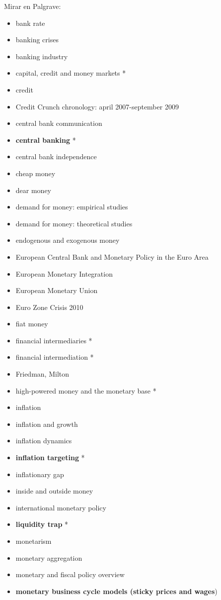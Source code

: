 \documentclass{nuevotema}
\begin{document}
Mirar en Palgrave:

\begin{itemize}
	\item bank rate
	\item banking crises
	\item banking industry
	\item capital, credit and money markets *
	\item credit
	\item Credit Crunch chronology: april 2007-september 2009
	\item central bank communication
	\item \textbf{central banking} *
	\item central bank independence
	\item cheap money
	\item dear money
	\item demand for money: empirical studies
	\item demand for money: theoretical studies
	\item endogenous and exogenous money
	\item European Central Bank and Monetary Policy in the Euro Area
	\item European Monetary Integration
	\item European Monetary Union
	\item Euro Zone Crisis 2010
	\item fiat money
	\item financial intermediaries *
	\item financial intermediation *
	\item Friedman, Milton
	\item high-powered money and the monetary base *
	\item inflation
	\item inflation and growth
	\item inflation dynamics
	\item \textbf{inflation targeting} *	
	\item inflationary gap
	\item inside and outside money
	\item international monetary policy
	\item \textbf{liquidity trap} *
	\item monetarism
	\item monetary aggregation
	\item monetary and fiscal policy overview
	\item \textbf{monetary business cycle models (sticky prices and wages})

\end{itemize}
\end{document}
